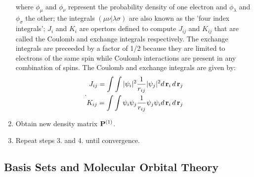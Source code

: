 \begin{enumerate}
\begin{equation}
\begin{aligned}
                        \end{aligned}
                    \end{equation}
                    where $\phi_\mu$ and $\phi_\nu$ represent the probability density of one electron and $\phi_\lambda$ and $\phi_\sigma$ the other; the integrals $(\mu \nu | \lambda \sigma)$ are also known as the 'four index integrals'; $J_i$ and $K_i$ are opertors defined to compute $J_{ij}$ and $K_{ij}$ that are called the Coulomb and exchange integrals respectively. The exchange integrals are preceeded by a factor of 1/2 because they are limited to electrons of the same spin while Coulomb interactions are present in any combination of spins. The Coulomb and exchange integrals are given by:
                    \begin{equation}\label{eq:Coulomb and exchange integrals}.
                        \begin{aligned}
                            J_{ij} = \displaystyle\int \int |\psi_i|^2 \frac{1}{r_{ij}} |\psi_j|^2 d\,{\mathbf {r}}_i\, d\,{\mathbf {r}}_j\\
                            K_{ij} = \displaystyle\int \int \psi_i \psi_j \frac{1}{r_{ij}} \psi_j \psi_i d\,{\mathbf {r}}_i\, d\,{\mathbf {r}}_j
                        \end{aligned}
                    \end{equation}
                     
                \item Obtain new density matrix ${\mathbf {P}}^{(1)}$.
                \item Repeat steps 3. and 4. until convergence.
            \end{enumerate}

        \subsection{Basis Sets and Molecular Orbital Theory}

